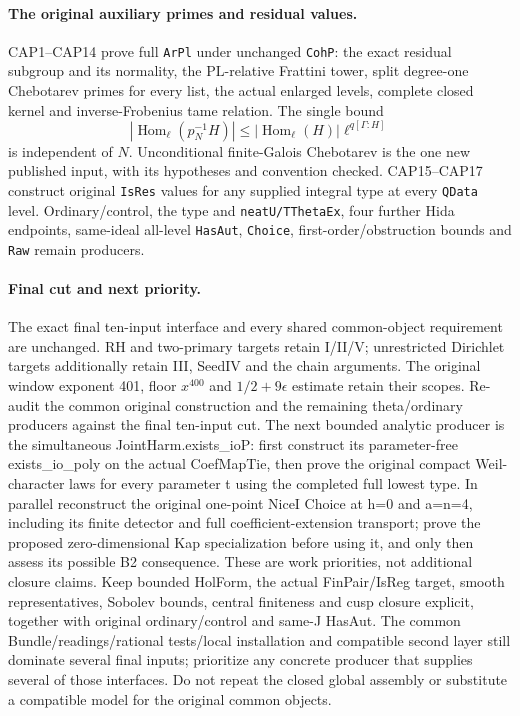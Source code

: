 \paragraph{The original auxiliary primes and residual values.}
CAP1--CAP14 prove full \texttt{ArPl} under unchanged \texttt{CohP}:
the exact residual subgroup and its normality, the $\mathrm{PL}$-relative
Frattini tower, split degree-one Chebotarev primes for every list,
the actual enlarged levels, complete closed kernel and inverse-Frobenius
tame relation. The single bound
\[
 |\operatorname{Hom}_\ell(p_N^{-1}H)|
 \le |\operatorname{Hom}_\ell(H)|\ell^{q[\Gamma:H]}
\]
is independent of $N$. Unconditional finite-Galois Chebotarev is the
one new published input, with its hypotheses and convention checked.
CAP15--CAP17 construct original \texttt{IsRes} values for any supplied
integral type at every \texttt{QData} level.
Ordinary/control, the type and \texttt{neatU/TThetaEx}, four further
Hida endpoints, same-ideal all-level \texttt{HasAut}, \texttt{Choice},
first-order/obstruction bounds and \texttt{Raw} remain producers.

\paragraph{Final cut and next priority.}
The exact final ten-input interface and every shared common-object
requirement are unchanged. RH and two-primary targets retain I/II/V;
unrestricted Dirichlet targets additionally retain III, SeedIV and
the chain arguments. The original window exponent 401, floor
$x^{400}$ and $1/2+9\epsilon$ estimate retain their scopes.
Re-audit the common original construction and the remaining theta/ordinary producers against the final ten-input cut. The next bounded analytic producer is the simultaneous JointHarm.exists\_ioP: first construct its parameter-free exists\_io\_poly on the actual CoefMapTie, then prove the original compact Weil-character laws for every parameter t using the completed full lowest type. In parallel reconstruct the original one-point NiceI Choice at h=0 and a=n=4, including its finite detector and full coefficient-extension transport; prove the proposed zero-dimensional Kap specialization before using it, and only then assess its possible B2 consequence. These are work priorities, not additional closure claims. Keep bounded HolForm, the actual FinPair/IsReg target, smooth representatives, Sobolev bounds, central finiteness and cusp closure explicit, together with original ordinary/control and same-J HasAut. The common Bundle/readings/rational tests/local installation and compatible second layer still dominate several final inputs; prioritize any concrete producer that supplies several of those interfaces. Do not repeat the closed global assembly or substitute a compatible model for the original common objects.

